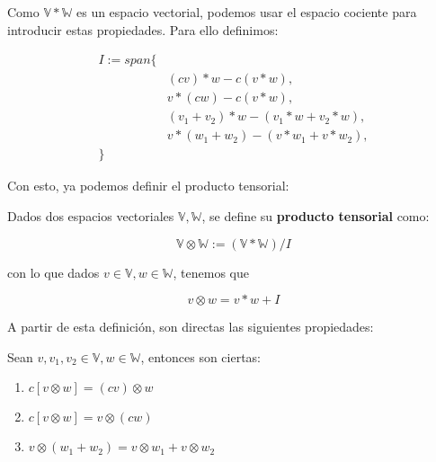 Como $\mathbb{V} \ast \mathbb{W}$ es un espacio vectorial, podemos usar el espacio cociente para introducir estas propiedades. Para ello definimos:

\begin{equation}
\begin{split}
    I := span\{& \\
               & (cv) \ast w - c(v \ast w), \\
               & v \ast (cw) - c(v \ast w), \\
               & (v_1 + v_2) \ast w - (v_1 \ast w + v_2 \ast w), \\
               & v \ast (w_1 + w_2) - (v \ast w_1 + v \ast w_2), \\
\}&
\end{split}
\end{equation}

Con esto, ya podemos definir el producto tensorial:

\begin{definicion}
    Dados dos espacios vectoriales $\mathbb{V}, \mathbb{W}$, se define su \textbf{producto tensorial} como:

    $$\mathbb{V} \otimes \mathbb{W} := (\mathbb{V} \ast \mathbb{W}) / I$$

    con lo que dados $v \in \mathbb{V}, w \in \mathbb{W}$, tenemos que

    $$v \otimes w = v \ast w + I$$
\end{definicion}

A partir de esta definición, son directas las siguientes propiedades:

\begin{proposicion}
    Sean $v, v_1, v_2 \in \mathbb{V}, w \in \mathbb{W}$, entonces son ciertas:
    \begin{enumerate}
        \item $c [v \otimes w] = (cv) \otimes w$
        \item $c[v \otimes w] = v \otimes (cw)$
        \item $v \otimes (w_1 + w_2) = v \otimes w_1 + v \otimes w_2$
    \end{enumerate}
\end{proposicion}

